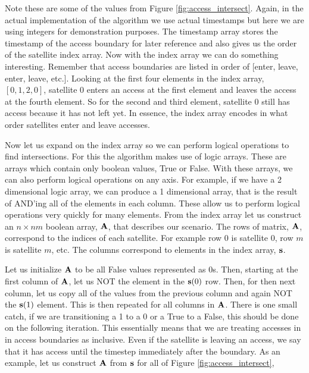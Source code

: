 Note these are some of the values from Figure \ref{fig:access_intersect}.
Again, in the actual implementation of the algorithm we use actual timestamps
but here we are using integers for demonstration purposes. The timestamp array
stores the timestamp of the access boundary for later reference and also gives
us the order of the satellite index array. Now with the index array we can do
something interesting. Remember that access boundaries are listed in order of
[enter, leave, enter, leave, etc.]. Looking at the first four elements in the
index array, $[0, 1, 2, 0]$, satellite 0 enters an access at the first element
and leaves the access at the fourth element. So for the second and third
element, satellite 0 still has access because it has not left yet. In essence,
the index array encodes in what order satellites enter and leave accesses. 

Now let us expand on the index array so we can perform logical operations to
find intersections. For this the algorithm makes use of logic arrays.  These
are arrays which contain only boolean values, True or False. With these arrays,
we can also perform logical operations on any axis. For example, if we have a 2
dimensional logic array, we can produce a 1 dimensional array, that is the
result of AND'ing all of the elements in each column. These allow us to perform
logical operations very quickly for many elements. From the index array let us
construct an $n\times nm$ boolean array, $\bm{\mathrm{A}}$, that describes our scenario.
The rows of matrix, $\bm{\mathrm{A}}$, correspond to the indices of each satellite.  For
example row 0 is satellite 0, row $m$ is satellite $m$, etc. The columns
correspond to elements in the index array, $\bm{\mathrm{s}}$.

Let us initialize $\bm{\mathrm{A}}$ to be all False values represented as 0s. Then,
starting at the first column of $\bm{\mathrm{A}}$, let us NOT the element in the
$\bm{\mathrm{s}}(0)$ row.  Then, for then next column, let us copy all of the values
from the previous column and again NOT the $\bm{\mathrm{s}}(1)$ element. This is then
repeated for all columns in $\bm{\mathrm{A}}$. There is one small catch, if we are
transitioning a 1 to a 0 or a True to a False, this should be done on the
following iteration. This essentially means that we are treating accesses in in
access boundaries as inclusive. Even if the satellite is leaving an access, we
say that it has access until the timestep immediately after the boundary. As an
example, let us construct $\bm{\mathrm{A}}$ from $\bm{\mathrm{s}}$ for all of Figure
\ref{fig:access_intersect},

